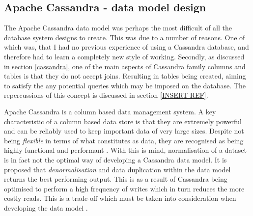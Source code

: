 \subsection{Apache Cassandra  - data model design}
The Apache Cassandra data model was perhaps the most difficult of all the database system designs to create. This was due to a number of reasons. One of which was, that I had no previous experience of using a Cassandra database, and therefore had to learn a completely new style of working. Secondly, as discussed in section \ref{cassandra}, one of the main aspects of Cassandra family columns and tables is that they do not accept joins. Resulting in tables being created, aiming to satisfy the any potential queries which may be imposed on the database. The repercussions of this concept is discussed in section \ref{INSERT REF}.

Apache Cassandra is a column based data management system. A key characteristic of a column based data store is that they are extremely powerful and can be reliably used to keep important data of very large sizes. Despite not being \textit{flexible} in terms of what constitutes as data, they are recognised as being highly functional and performant \cite{cassandra}. With this is mind, normalisation of a dataset is in fact not the optimal way of developing a Cassandra data model. It is proposed that \textit{denormalisation} and data duplication within the data model returns the best performing output. This is as a result of Cassandra being optimised to perform a high frequency of writes which in turn reduces the more costly reads. This is a trade-off which must be taken into consideration when developing the data model \cite{cassandra}.




